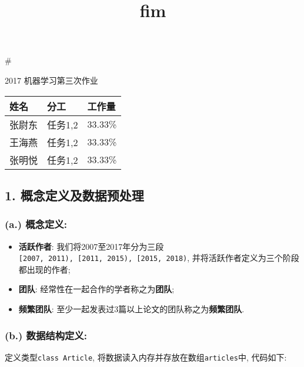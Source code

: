 \documentclass[11pt]{article}
\title{fim}
\providecommand{\tightlist}{%
      \setlength{\itemsep}{0pt}\setlength{\parskip}{0pt}}
\begin{document}
    
    
    \maketitle
    
    

    
    \#

2017 机器学习第三次作业

\begin{longtable}[c]{@{}lll@{}}
\toprule
姓名 & 分工 & 工作量\tabularnewline
\midrule
\endhead
张尉东 & 任务1,2 & 33.33\%\tabularnewline
王海燕 & 任务1,2 & 33.33\%\tabularnewline
张明悦 & 任务1,2 & 33.33\%\tabularnewline
\bottomrule
\end{longtable}

    \subsection{1.
概念定义及数据预处理}\label{ux6982ux5ff5ux5b9aux4e49ux53caux6570ux636eux9884ux5904ux7406}

\subsubsection{(a.) 概念定义:}\label{a.-ux6982ux5ff5ux5b9aux4e49}

\begin{itemize}
\tightlist
\item
  \textbf{活跃作者}:
  我们将2007至2017年分为三段\texttt{{[}2007,\ 2011),\ {[}2011,\ 2015),\ {[}2015,\ 2018)},
  并将活跃作者定义为三个阶段都出现的作者;
\item
  \textbf{团队}: 经常性在一起合作的学者称之为\textbf{团队};
\item
  \textbf{频繁团队}:
  至少一起发表过3篇以上论文的团队称之为\textbf{频繁团队}.
\end{itemize}

\subsubsection{(b.)
数据结构定义:}\label{b.-ux6570ux636eux7ed3ux6784ux5b9aux4e49}

定义类型\texttt{class\ Article},
将数据读入内存并存放在数组\texttt{articles}中, 代码如下:
\end{document}
